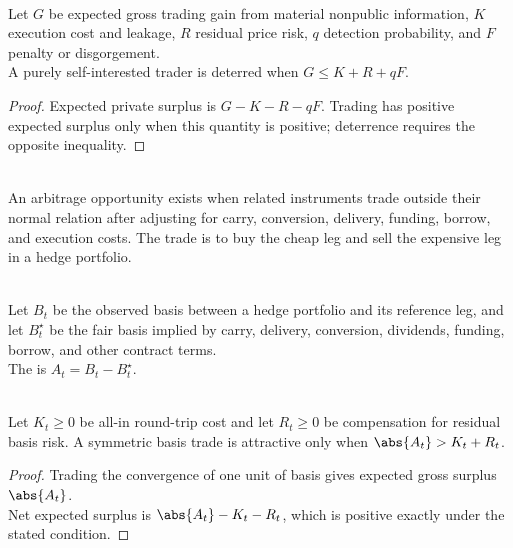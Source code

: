 \begin{proposition} \\
Let $G$ be expected gross trading gain from material nonpublic information, $K$ execution cost and leakage, $R$ residual price risk, $q$ detection probability, and $F$ penalty or disgorgement.\\
A purely self-interested trader is deterred when $G\le K+R+qF$.
\begin{proof}
Expected private surplus is $G-K-R-qF$. Trading has positive expected surplus only when this quantity is positive; deterrence requires the opposite inequality.
\end{proof}
\end{proposition}

\begin{definition} \\
An arbitrage opportunity exists when related instruments trade outside their normal relation after adjusting for carry, conversion, delivery, funding, borrow, and execution costs. The trade is to buy the cheap leg and sell the expensive leg in a hedge portfolio.
\end{definition}

\begin{notation} \\
Let $B_t$ be the observed basis between a hedge portfolio and its reference leg, and let $B_t^\star$ be the fair basis implied by carry, delivery, conversion, dividends, funding, borrow, and other contract terms.\\
The  is $A_t=B_t-B_t^\star$.
\end{notation}

\begin{proposition} \\
Let $K_t\ge0$ be all-in round-trip cost and let $R_t\ge0$ be compensation for residual basis risk. A symmetric basis trade is attractive only when $\abs{A_t}>K_t+R_t$.
\begin{proof}
Trading the convergence of one unit of basis gives expected gross surplus $\abs{A_t}$.\\
Net expected surplus is $\abs{A_t}-K_t-R_t$, which is positive exactly under the stated condition.
\end{proof}
\end{proposition}

